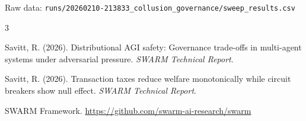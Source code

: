 \documentclass[11pt]{article}
\begin{document}
Raw data: \texttt{runs/20260210-213833\_collusion\_governance/sweep\_results.csv}

\begin{thebibliography}{3}

Savitt, R. (2026).
Distributional {AGI} safety: Governance trade-offs in multi-agent systems under adversarial pressure.
\emph{SWARM Technical Report}.

Savitt, R. (2026).
Transaction taxes reduce welfare monotonically while circuit breakers show null effect.
\emph{SWARM Technical Report}.

SWARM Framework. \url{https://github.com/swarm-ai-research/swarm}

\end{thebibliography}
\end{document}
